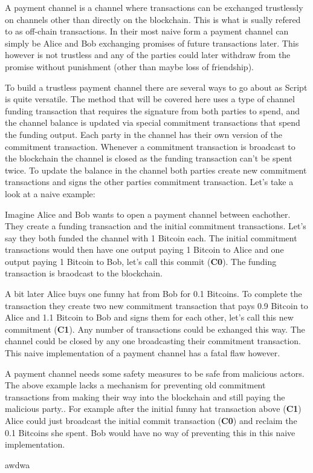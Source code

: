 
A payment channel is a channel where transactions can be exchanged trustlessly on channels other than directly on the blockchain.
This is what is sually refered to as off-chain transactions.
In their most naive form a payment channel can simply be Alice and Bob exchanging promises of future transactions later.
This however is not trustless and any of the parties could later withdraw from the promise without punishment (other than maybe loss of friendship).

To build a trustless payment channel there are several ways to go about as Script is quite versatile.
The method that will be covered here uses a type of channel funding transaction that requires the signature from both parties to spend, and the channel balance is updated via special commitment transactions that spend the funding output. Each party in the channel has their own version of the commitment transaction. Whenever a commitment transaction is broadcast to the blockchain the channel is closed as the funding transaction can't be spent twice. To update the balance in the channel both parties create new commitment transactions and signs the other parties commitment transaction.  
Let's take a look at a naive example:

Imagine Alice and Bob wants to open a payment channel between eachother. They create a funding transaction and the initial commitment transactions. Let's say they both funded the channel with 1 Bitcoin each. The initial commitment transactions would then have one output paying 1 Bitcoin to Alice and one output paying 1 Bitcoin to Bob, let's call this commit (\textbf{C0}).
The funding transaction is braodcast to the blockchain.

A bit later Alice buys one funny hat from Bob for 0.1 Bitcoins. To complete the transaction they create two new commitment transaction that pays 0.9 Bitcoin to Alice and 1.1 Bitcoin to Bob and signs them for each other, let's call this new commitment (\textbf{C1}). Any number of transactions could be exhanged this way. The channel could be closed by any one broadcasting their commitment transaction. This naive implementation of a payment channel has a fatal flaw however. 

A payment channel needs some safety measures to be safe from malicious actors. The above example lacks a mechanism for preventing old commitment transactions from making their way into the blockchain and still paying the malicious party.. For example after the initial funny hat transaction above (\textbf{C1}) Alice could just broadcast the initial commit transaction (\textbf{C0}) and reclaim the 0.1 Bitcoins she spent. Bob would have no way of preventing this in this naive implementation.

awdwa
